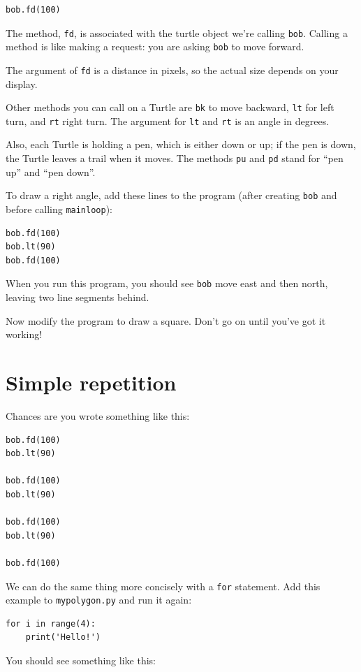 \documentclass[10pt]{book}
\begin{document}
\begin{verbatim}
bob.fd(100)
\end{verbatim}
%
The method, {\tt fd}, is associated with the turtle
object we're calling {\tt bob}.  
Calling a method is like making a request: you are asking {\tt bob}
to move forward.

The argument of {\tt fd} is a distance in pixels, so the actual
size depends on your display.

Other methods you can call on a Turtle are {\tt bk} to move
backward, {\tt lt} for left turn, and {\tt rt} right turn.  The
argument for {\tt lt} and {\tt rt} is an angle in degrees.

Also, each Turtle is holding a pen, which is
either down or up; if the pen is down, the Turtle leaves
a trail when it moves.  The methods {\tt pu} and {\tt pd}
stand for ``pen up'' and ``pen down''.

To draw a right angle, add these lines to the program
(after creating {\tt bob} and before calling \verb"mainloop"):

\begin{verbatim}
bob.fd(100)
bob.lt(90)
bob.fd(100)
\end{verbatim}
%
When you run this program, you should see {\tt bob} move east and then
north, leaving two line segments behind.

Now modify the program to draw a square.  Don't go on until
you've got it working!


\section{Simple repetition}
\label{repetition}

Chances are you wrote something like this:

\begin{verbatim}
bob.fd(100)
bob.lt(90)

bob.fd(100)
bob.lt(90)

bob.fd(100)
bob.lt(90)

bob.fd(100)
\end{verbatim}
%
We can do the same thing more concisely with a {\tt for} statement.
Add this example to {\tt mypolygon.py} and run it again:

\begin{verbatim}
for i in range(4):
    print('Hello!')
\end{verbatim}
%
You should see something like this:
\end{document}
